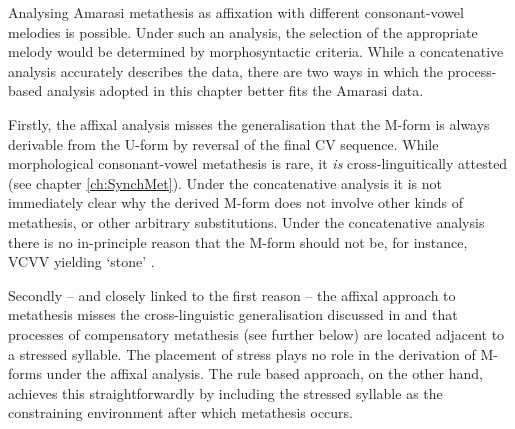 Analysing Amarasi metathesis as affixation
with different consonant-vowel melodies is possible.
Under such an analysis,
the selection of the appropriate melody
would be determined by morphosyntactic criteria.
While a concatenative analysis accurately describes the data,
there are two ways in which the process-based
analysis adopted in this chapter better fits the Amarasi data.

Firstly, the affixal analysis misses the generalisation
that the M-form is always derivable from the U-form
by reversal of the final CV sequence.
While morphological consonant-vowel metathesis is rare,
it \emph{is} cross-linguitically attested
(see chapter \ref{ch:SynchMet}).
Under the concatenative analysis it is not
immediately clear why the derived M-form
does not involve other kinds of metathesis,
or other arbitrary substitutions.
Under the concatenative analysis
there is no in-principle reason that the M-form
should not be, for instance, VCVV yielding  `stone' {\ra} .

Secondly -- and closely linked to the first reason --
the affixal approach to metathesis
misses the cross-linguistic generalisation discussed
in  and 
that processes of compensatory metathesis (see further  below)
are located adjacent to a stressed syllable.
The placement of stress plays no role
in the derivation of M-forms under the affixal analysis.
The rule based approach, on the other hand,
achieves this straightforwardly by including the stressed
syllable as the constraining environment after which metathesis occurs.